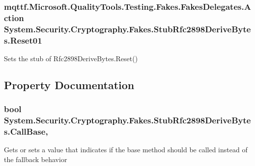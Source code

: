 \hypertarget{class_system_1_1_security_1_1_cryptography_1_1_fakes_1_1_stub_rfc2898_derive_bytes_a4a437a606658b1a7fded2d6a4631b545}{
\subsubsection[{Reset01}]{\setlength{\rightskip}{0pt plus 5cm}mqttf.\-Microsoft.\-Quality\-Tools.\-Testing.\-Fakes.\-Fakes\-Delegates.\-Action System.\-Security.\-Cryptography.\-Fakes.\-Stub\-Rfc2898\-Derive\-Bytes.\-Reset01}}\label{class_system_1_1_security_1_1_cryptography_1_1_fakes_1_1_stub_rfc2898_derive_bytes_a4a437a606658b1a7fded2d6a4631b545}


Sets the stub of Rfc2898\-Derive\-Bytes.\-Reset()



\subsection{Property Documentation}
\hypertarget{class_system_1_1_security_1_1_cryptography_1_1_fakes_1_1_stub_rfc2898_derive_bytes_aac7193bf764bd6eb960c5b1aad7822e3}{
\subsubsection[{Call\-Base}]{\setlength{\rightskip}{0pt plus 5cm}bool System.\-Security.\-Cryptography.\-Fakes.\-Stub\-Rfc2898\-Derive\-Bytes.\-Call\-Base\hspace{0.3cm}{\ttfamily [get]}, {\ttfamily [set]}}}\label{class_system_1_1_security_1_1_cryptography_1_1_fakes_1_1_stub_rfc2898_derive_bytes_aac7193bf764bd6eb960c5b1aad7822e3}


Gets or sets a value that indicates if the base method should be called instead of the fallback behavior

